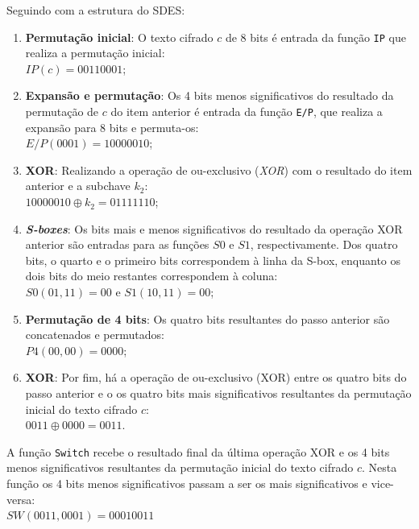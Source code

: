 \documentclass{article}
\begin{document}
\begin{enumerate}
    Seguindo com a estrutura do SDES:
    \begin{enumerate}
        \item \textbf{Permutação inicial}: O texto cifrado $c$ de 8 bits é
            entrada da função \texttt{IP} que realiza a permutação inicial: \\
        $IP(c) = 00110001$;
        \item \textbf{Expansão e permutação}: Os 4 bits menos significativos do
            resultado da permutação de $c$ do item anterior é entrada da função
            \texttt{E/P}, que realiza a expansão para 8 bits e permuta-os: \\
        $E/P(0001) = 10000010$;
        \item \textbf{XOR}: Realizando a operação de ou-exclusivo
            (\textit{XOR}) com o resultado do item anterior e a subchave
            $k_{2}$: \\
        $10000010 \oplus k_{2} = 01111110$;
        \item \textbf{\textit{S-boxes}}: Os bits mais e menos significativos do
            resultado da operação XOR anterior são entradas para as funções
            $S0$ e $S1$, respectivamente. Dos quatro bits, o quarto e o
            primeiro bits correspondem à linha da S-box, enquanto os dois bits
            do meio restantes correspondem à coluna: \\
        $S0(01, 11) = 00$ e $S1(10, 11) = 00$;
        \item \textbf{Permutação de 4 bits}: Os quatro bits resultantes do
            passo anterior são concatenados e permutados: \\
        $P4(00, 00) = 0000$;
        \item \textbf{XOR}: Por fim, há a operação de ou-exclusivo (XOR) entre
            os quatro bits do passo anterior e o os quatro bits mais
            significativos resultantes da permutação inicial do texto cifrado
            $c$: \\
        $0011 \oplus 0000 = 0011$.
    \end{enumerate}

    A função \texttt{Switch} recebe o resultado final da última operação XOR e
    os 4 bits menos significativos resultantes da permutação inicial do texto
    cifrado $c$. Nesta função os 4 bits menos significativos passam a ser os
    mais significativos e vice-versa: \\
    $SW(0011, 0001) = 00010011$
    

\end{enumerate}
\end{document}
